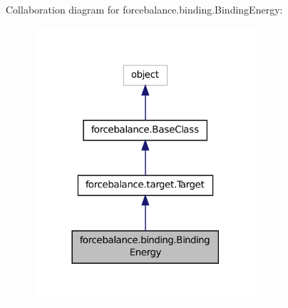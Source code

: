 Collaboration diagram for forcebalance.\-binding.\-Binding\-Energy\-:\nopagebreak
\begin{figure}[H]
\begin{center}
\leavevmode
\includegraphics[width=234pt]{classforcebalance_1_1binding_1_1BindingEnergy__coll__graph}
\end{center}
\end{figure}
